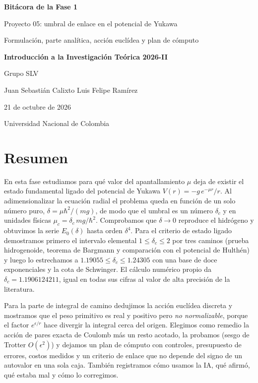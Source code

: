 \documentclass[11pt]{article}
\newcommand{\dc}{\delta_c}
\begin{document}
\begin{titlepage}
\centering
\vspace*{2.5cm}
{\LARGE\bfseries Bitácora de la Fase 1\par}
\vspace{0.4cm}
{\Large Proyecto 05: umbral de enlace en el potencial de Yukawa\par}
\vspace{0.4cm}
{\normalsize Formulación, parte analítica, acción euclídea y plan de cómputo\par}
\vspace{1.5cm}
{\large\bfseries Introducción a la Investigación Teórica 2026-II\par}
\vspace{1.2cm}
{\normalsize Grupo SLV\par}
{\normalsize Juan Sebastián Calixto \quad Luis Felipe Ramírez\par}
\vspace{1cm}
{\normalsize 21 de octubre de 2026\par}
\vfill
{\normalsize Universidad Nacional de Colombia\par}
\end{titlepage}

\section*{Resumen}

En esta fase estudiamos para qué valor del apantallamiento $\mu$ deja de existir el estado fundamental ligado del potencial de Yukawa $V(r)=-g\,e^{-\mu r}/r$. Al adimensionalizar la ecuación radial el problema queda en función de un solo número puro, $\delta=\mu\hbar^2/(mg)$, de modo que el umbral es un número $\dc$ y en unidades físicas $\mu_c=\dc\,mg/\hbar^2$. Comprobamos que $\delta\to0$ reproduce el hidrógeno y obtuvimos la serie $E_0(\delta)$ hasta orden $\delta^4$. Para el criterio de estado ligado demostramos primero el intervalo elemental $1\le\dc\le2$ por tres caminos (prueba hidrogenoide, teorema de Bargmann y comparación con el potencial de Hulthén) y luego lo estrechamos a $1.19055\le\dc\le1.24305$ con una base de doce exponenciales y la cota de Schwinger. El cálculo numérico propio da $\dc=1.1906124211$, igual en todas sus cifras al valor de alta precisión de la literatura.

Para la parte de integral de camino dedujimos la acción euclídea discreta y mostramos que el peso primitivo es real y positivo pero \emph{no normalizable}, porque el factor $e^{\epsilon/r}$ hace divergir la integral cerca del origen. Elegimos como remedio la acción de pares exacta de Coulomb más un resto acotado, la probamos (sesgo de Trotter $O(\epsilon^2)$) y dejamos un plan de cómputo con controles, presupuesto de errores, costos medidos y un criterio de enlace que no depende del signo de un autovalor en una sola caja. También registramos cómo usamos la IA, qué afirmó, qué estaba mal y cómo lo corregimos.
\end{document}
